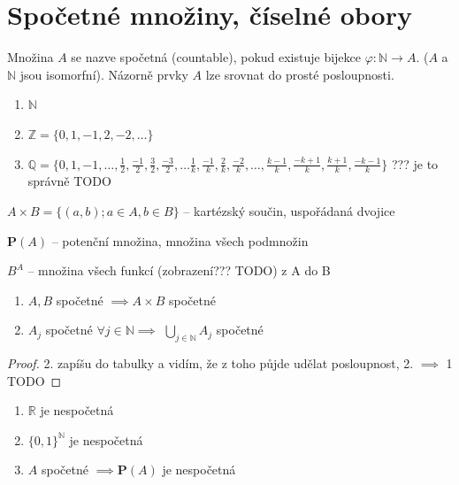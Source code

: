 \renewcommand{\thesection}{X}
\section{Spočetné množiny, číselné obory}

\begin{definice}
  Množina $A$ se nazve spočetná (countable), pokud existuje bijekce $\varphi: \mathbb N \to A$. ($A$ a $\mathbb N$ jsou isomorfní). Názorně prvky $A$ lze srovnat do prosté posloupnosti.
\end{definice}

\begin{priklad}
  \begin{enumerate}
    \item $\mathbb N$
    \item $\mathbb Z = \{0, 1, -1, 2, -2, \dots\}$
    \item $\mathbb Q = \{0, 1, -1, \dots, \frac{1}{2}, \frac{-1}{2}, \frac{3}{2}, \frac{-3}{2}, \dots \frac{1}{k}, \frac{-1}{k}, \frac{2}{k}, \frac{-2}{k}, \dots, \frac{k-1}{k}, \frac{-k+1}{k}, \frac{k+1}{k}, \frac{-k-1}{k}\}$ ??? je to správně TODO
  \end{enumerate}
\end{priklad}

\begin{poznamka}[Značení]
  $A \times B = \{(a, b); a \in A, b \in B\}$ -- kartézský součin, uspořádaná dvojice

  $\mathbf P(A)$ -- potenční množina, množina všech podmnožin

  $B^A$ -- množina všech funkcí (zobrazení??? TODO) z A do B
\end{poznamka}

\begin{veta}
  \begin{enumerate}[1.]
    \item $A, B$ spočetné $\implies A \times B$ spočetné
    \item $A_j$ spočetné $\forall j \in \mathbb N \implies$ $\bigcup_{j\in \mathbb N}A_j$ spočetné
  \end{enumerate}
\end{veta}

\begin{proof}
  2. zapíšu do tabulky a vidím, že z toho půjde udělat posloupnost, 2. $\implies$ 1 TODO
\end{proof}

\begin{veta}
  \begin{enumerate}[1.]
    \item $\mathbb R$ je nespočetná
    \item $\{0,1\}^{\mathbb N}$ je nespočetná
    \item $A$ spočetné $\implies \mathbf P(A)$ je nespočetná
  \end{enumerate}
\end{veta}

